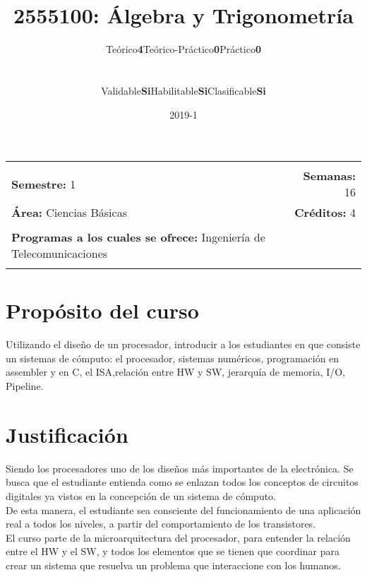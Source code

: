 \documentclass[11pt]{article}
\title{2555100: Álgebra y Trigonometría}
\author{\begin{tabular} {c|c|c|c|c|c} Teórico & \textbf{4} & Teórico-Práctico & \textbf{0} & Práctico & \textbf{0}\end{tabular}
\\
\begin{tabular} {c|c|c|c|c|c} Validable & \textbf{Si} & Habilitable & \textbf{Si} & Clasificable & \textbf{Si}\end{tabular}}
\date{2019-1}
\newcommand{\blankline}{\quad\pagebreak[2]}
\begin{document}
\maketitle

\begin{tabular*}{.93\textwidth}{@{\extracolsep{\fill}}lr}
\hline\\

\textbf{Semestre:} 1 & \textbf{Semanas:} 16
\\
\textbf{Área:} Ciencias Básicas &    \textbf{Créditos:} 4 
\\ & \\
\textbf{Programas a los cuales se ofrece:} Ingeniería de Telecomunicaciones
\\ & \\
\hline
\end{tabular*}

\vspace{5 mm}

\section*{Propósito del curso}

Utilizando el diseño de un procesador, introducir a los estudiantes en que consiste un sistemas de cómputo: el procesador, sistemas numéricos, programación en assembler y en C, el ISA,relación entre HW y SW, jerarquía de memoria, I/O, Pipeline.



\section*{Justificación}

Siendo los procesadores uno de los diseños más importantes de la electrónica. Se busca que el estudiante entienda como se enlazan todos los conceptos de circuitos digitales ya vistos en la concepción de un sistema de cómputo.
\\De esta manera, el estudiante sea consciente del funcionamiento de una aplicación real a todos los niveles, a partir del comportamiento de los transistores.
\\El curso parte de la microarquitectura del procesador, para entender la relación entre el HW y el SW, y todos los elementos que se tienen que coordinar para crear un sistema que resuelva un problema que interaccione con los humanos.
\end{document}
